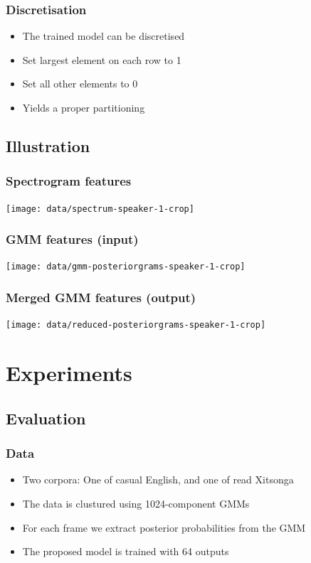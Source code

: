 \documentclass[british]{beamer}
\begin{document}
  \begin{frame}
   \frametitle{Discretisation}
   
   \begin{itemize}
    \item The trained model can be discretised
    \item Set largest element on each row to 1
    \item Set all other elements to 0
    \item Yields a proper partitioning
   \end{itemize}
  \end{frame}

  
  \subsection{Illustration}
  
  \begin{frame}
    \frametitle{Spectrogram features}
   \centering
   \texttt{[image: data/spectrum-speaker-1-crop]}
  \end{frame}
  
  \begin{frame}
    \frametitle{GMM features (input)}
   \centering
   \texttt{[image: data/gmm-posteriorgrams-speaker-1-crop]}
  \end{frame}
  
  \begin{frame}
    \frametitle{Merged GMM features (output)}
   \centering
   \texttt{[image: data/reduced-posteriorgrams-speaker-1-crop]}
  \end{frame}

  \section{Experiments}
  \subsection{Evaluation}
  \begin{frame}
    \frametitle{Data}
    
    \begin{itemize}
     \item Two corpora: One of casual English, and one of read Xitsonga
     \item The data is clustured using 1024-component GMMs
     \item For each frame we extract posterior probabilities from the GMM
     \item The proposed model is trained with 64 outputs
    \end{itemize}
    
  \end{frame}
\end{document}
